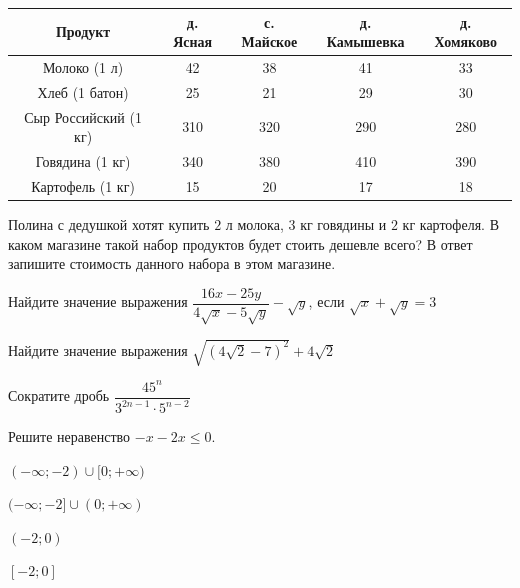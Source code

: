 \begin{listofex}
	\begin{center}
		\footnotesize
		\begin{tabular}{|c|c|c|c|c|}
			\hline
			\rowcolor{gray}\textbf{Продукт}&\textbf{д. Ясная}&\textbf{с. Майское}&\textbf{д. Камышевка}&\textbf{д. Хомяково}\\
			\hline
			Молоко (1 л)&42&38&41&33\\
			\hline
			Хлеб (1 батон)&25&21&29&30\\
			\hline
			Сыр Российский (1 кг)&310&320&290&280\\
			\hline
			Говядина (1 кг)&340&380&410&390\\
			\hline
			Картофель (1 кг)&15&20&17&18\\
			\hline
		\end{tabular}
	\end{center}
	Полина с дедушкой хотят купить \( 2 \) л молока, \( 3 \) кг говядины и \( 2 \) кг картофеля. В каком магазине такой набор продуктов будет стоить дешевле всего? В ответ запишите стоимость данного набора в этом магазине.
	\item {}
	\item {}
	\item {}
	\item Найдите значение выражения \( \dfrac{16x-25y}{4\sqrt{x}-5\sqrt{y}}-\sqrt{y} \), если \( \sqrt{x}+\sqrt{y}=3 \)
	\item Найдите значение выражения \( \sqrt{(4\sqrt{2}-7)^2}+4\sqrt{2} \)
	\item Сократите дробь \( \dfrac{45^n}{3^{2n-1}\cdot5^{n-2}} \)
	\item Решите неравенство \( -x-2x\le0 \).\\ \selectanswer
	\begin{enumcols}[itemcolumns=2]
		\item \( (-\infty;-2)\cup[0;+\infty) \)
		\item \( (-\infty;-2]\cup(0;+\infty) \)
		\item \( (-2;0) \)
		\item \( [-2;0] \)
	\end{enumcols}
\end{listofex}
%	
%	
